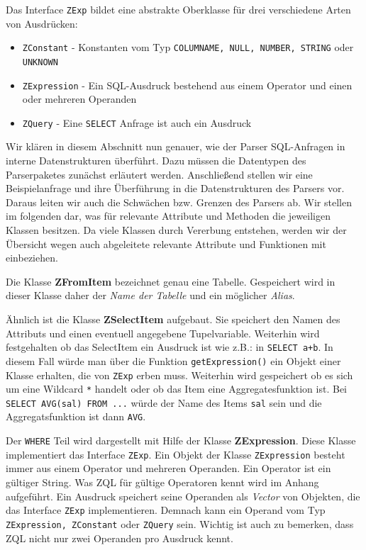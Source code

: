 Das Interface \verb|ZExp| bildet eine abstrakte Oberklasse für drei verschiedene Arten von Ausdrücken:

\begin{itemize}
\item \verb|ZConstant| - Konstanten vom Typ \verb|COLUMNAME, NULL, NUMBER, STRING| oder \verb|UNKNOWN|
\item \verb|ZExpression| - Ein SQL-Ausdruck bestehend aus einem Operator und einen oder mehreren Operanden
\item \verb|ZQuery| - Eine \verb|SELECT| Anfrage ist auch ein Ausdruck
\end{itemize}

Wir klären in diesem Abschnitt nun genauer, wie der Parser SQL-Anfragen in interne Datenstrukturen überführt.
Dazu müssen die Datentypen des Parserpaketes zunächst erläutert werden. Anschließend stellen wir eine Beispielanfrage und ihre Überführung in die Datenstrukturen des Parsers vor. Daraus leiten wir auch die Schwächen bzw. Grenzen des Parsers ab. Wir stellen im folgenden dar, was für relevante Attribute und Methoden die jeweiligen Klassen besitzen. Da viele Klassen durch Vererbung entstehen, werden wir der Übersicht wegen auch abgeleitete relevante Attribute und Funktionen mit einbeziehen.

Die Klasse \textbf{ZFromItem} bezeichnet genau eine Tabelle. Gespeichert wird in dieser Klasse daher der \textit{Name der Tabelle} und ein möglicher \textit{Alias}.

Ähnlich ist die Klasse \textbf{ZSelectItem} aufgebaut. Sie speichert den Namen des Attributs und einen eventuell angegebene Tupelvariable. Weiterhin wird festgehalten ob das SelectItem ein Ausdruck ist wie z.B.: in \verb|SELECT a+b|. In diesem Fall würde man über die Funktion \verb|getExpression()| ein Objekt einer Klasse erhalten, die von \verb|ZExp| erben muss. Weiterhin wird gespeichert ob es sich um eine Wildcard \verb|*| handelt oder ob das Item eine Aggregatesfunktion ist. Bei \verb|SELECT AVG(sal) FROM ...| würde der Name des Items \verb|sal| sein und die Aggregatsfunktion ist dann \verb|AVG|. 

Der \verb|WHERE| Teil wird dargestellt mit Hilfe der Klasse \textbf{ZExpression}. Diese Klasse implementiert das Interface \verb|ZExp|. Ein Objekt der Klasse \verb|ZExpression| besteht immer aus einem Operator und mehreren Operanden. Ein Operator ist ein gültiger String. Was ZQL für gültige Operatoren kennt wird im Anhang aufgeführt. Ein Ausdruck speichert seine Operanden als \textit{Vector} von Objekten, die das Interface \verb|ZExp| implementieren. Demnach kann ein Operand vom Typ \verb|ZExpression, ZConstant| oder \verb|ZQuery| sein.
Wichtig ist auch zu bemerken, dass ZQL nicht nur zwei Operanden pro Ausdruck kennt. 

